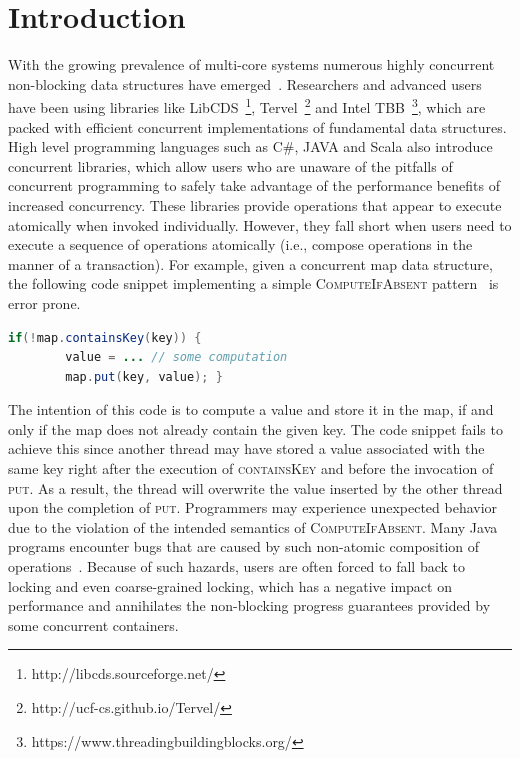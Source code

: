 \documentclass{sig-alternate-05-2015}
\begin{document}
\printccsdesc


\section{Introduction}
\label{sec:intro}
With the growing prevalence of multi-core systems numerous highly concurrent non-blocking data structures have emerged~\cite{linden2013skiplist,ellen2010non,zhang2015lockfree,michael2002high}.
Researchers and advanced users have been using libraries like LibCDS~\footnote{http://libcds.sourceforge.net/}, Tervel~\footnote{http://ucf-cs.github.io/Tervel/} and Intel TBB~\footnote{https://www.threadingbuildingblocks.org/}, which are packed with efficient concurrent implementations of fundamental data structures.
High level programming languages such as C\#, JAVA and Scala also introduce concurrent libraries, which allow users who are unaware of the pitfalls of concurrent programming to safely take advantage of the performance benefits of increased concurrency.
These libraries provide operations that appear to execute atomically when invoked individually.
However, they fall short when users need to execute a sequence of operations atomically (i.e., compose operations in the manner of a transaction).
For example, given a concurrent map data structure, the following code snippet implementing a simple \textsc{ComputeIfAbsent} pattern~\cite{golan2013concurrent} is error prone.
\begin{lstlisting}[basicstyle=\small,language=JAVA]
    if(!map.containsKey(key)) {
        value = ... // some computation
        map.put(key, value); }
\end{lstlisting}
The intention of this code is to compute a value and store it in the map, if and only if the map does not already contain the given key.
The code snippet fails to achieve this since another thread may have stored a value associated with the same key right after the execution of \textsc{containsKey} and before the invocation of \textsc{put}.
As a result, the thread will overwrite the value inserted by the other thread upon the completion of \textsc{put}.
Programmers may experience unexpected behavior due to the violation of the intended semantics of \textsc{ComputeIfAbsent}.
Many Java programs encounter bugs that are caused by such non-atomic composition of operations~\cite{shacham2011testing}.
Because of such hazards, users are often forced to fall back to locking and even coarse-grained locking, which has a negative impact on performance and annihilates the non-blocking progress guarantees provided by some concurrent containers.
\end{document}
